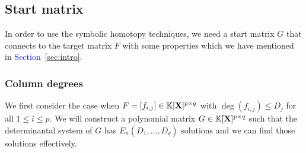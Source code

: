 \documentclass[11pt]{article}
\numberwithin{Property}{section}
\numberwithin{Theorem}{section}
\numberwithin{Proposition}{section}
\numberwithin{Lemma}{section}
\numberwithin{Corollary}{section}
\numberwithin{Definition}{section}
\numberwithin{Remark}{section}
\numberwithin{Conjecture}{section}
\numberwithin{Problem}{section}
\numberwithin{Claim}{section}
\theoremstyle{definition}
\numberwithin{Example}{section}
\renewcommand{\leq}{\leqslant}
\newcommand{\field}{\mathbb{K}} %
\newcommand{\mat}[1]{\mathbf{\MakeUppercase{#1}}} %
\newcommand{\improve}[1]{\textcolor{blue}{#1}} %
\begin{document}
\subsection{Start matrix}
In order to use the symbolic homotopy techniques, we need a start matrix $G$ that connects to the target matrix $F$ with some properties which we have mentioned in \improve{Section~\ref{sec:intro}}. 
\subsubsection{Column degrees}
\label{subsec:cd}
We first consider the case when $F = [f_{i,j}] \in \field[\mat{X}]^{p\times q}$ with $\deg({f_{i,j}}) \leq D_j$ for all $1 \leq i \leq p$. We will construct a polynomial matrix $G \in \field[\mat{X}]^{p \times q}$ such that the determinantal system of $G$ has $E_{n}(D_1, \ldots, D_q)$ solutions and we can find those solutions effectively. 
\end{document}
